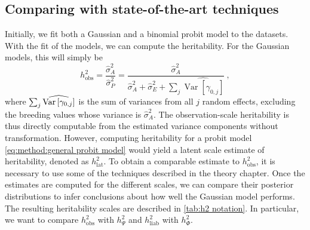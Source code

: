 \subsection{Comparing with state-of-the-art techniques}
\label{sec:method:compute h2}
Initially, we fit both a Gaussian and a binomial probit model to the datasets. With the fit of the models, we can compute the heritability. For the Gaussian models, this will simply be
\begin{equation}
\label{eq:heriability directly computed}
    h^2_\text{obs} = \frac{\hat \sigma^2_A}{\hat \sigma^2_P}=\frac{\hat{\sigma}^2_A}{\hat\sigma^2_A + \hat\sigma^2_E + \sum_{j} \widehat{\operatorname{Var}[\gamma_{0,j}]}} \ ,
\end{equation}
where $\sum_j \widehat{\operatorname{Var}\left[\gamma_{0,j}\right]}$ is the sum of variances from all $j$ random effects, excluding the breeding values whose variance is $\hat\sigma^2_A$.
The observation-scale heritability is thus directly computable from the estimated variance components without transformation. However, computing heritability for a probit model \eqref{eq:method:general probit model} would yield a latent scale estimate of heritability, denoted as $h^2_\text{lat}$. To obtain a comparable estimate to $h^2_\text{obs}$, it is necessary to use some of the techniques described in the theory chapter. 
Once the estimates are computed for the different scales, we can compare their posterior distributions to infer conclusions about how well the Gaussian model performs. The resulting heritability scales are described in \autoref{tab:h2 notation}. In particular, we want to compare $h^2_\text{obs}$ with $h^2_\Psi$ and $h^2_\text{liab}$ with $h^2_{\Phi}$.
